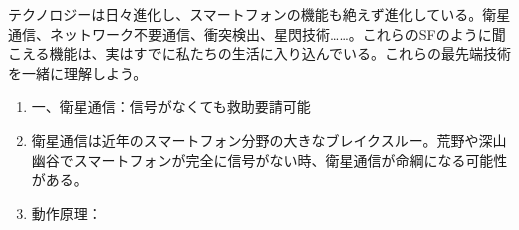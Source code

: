 \begin{tcbpractice}{テクノロジーは日々進化し、スマートフォンの機能も絶えず進化している。衛星通信、ネットワーク不要通信、衝突検出、星閃技術……。これらのSFのように聞こえる機能は、実はすでに私たちの生活に入り込んでいる。これらの最先端技術を一緒に理解しよう。}
\begin{enumerate}
  \item 一、衛星通信：信号がなくても救助要請可能
  \item 衛星通信は近年のスマートフォン分野の大きなブレイクスルー。荒野や深山幽谷でスマートフォンが完全に信号がない時、衛星通信が命綱になる可能性がある。
  \item 動作原理：
\end{enumerate}

\end{tcbpractice}
